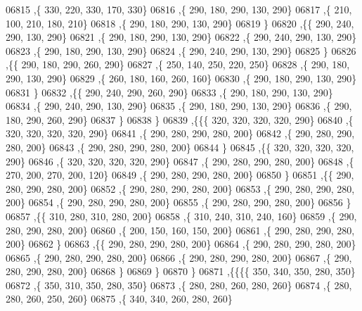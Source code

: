 \begin{DoxyCode}
06815     ,\{   330,   220,   330,   170,   330\}
06816     ,\{   290,   180,   290,   130,   290\}
06817     ,\{   210,   100,   210,   180,   210\}
06818     ,\{   290,   180,   290,   130,   290\}
06819     \}
06820    ,\{\{   290,   240,   290,   130,   290\}
06821     ,\{   290,   180,   290,   130,   290\}
06822     ,\{   290,   240,   290,   130,   290\}
06823     ,\{   290,   180,   290,   130,   290\}
06824     ,\{   290,   240,   290,   130,   290\}
06825     \}
06826    ,\{\{   290,   180,   290,   260,   290\}
06827     ,\{   250,   140,   250,   220,   250\}
06828     ,\{   290,   180,   290,   130,   290\}
06829     ,\{   260,   180,   160,   260,   160\}
06830     ,\{   290,   180,   290,   130,   290\}
06831     \}
06832    ,\{\{   290,   240,   290,   260,   290\}
06833     ,\{   290,   180,   290,   130,   290\}
06834     ,\{   290,   240,   290,   130,   290\}
06835     ,\{   290,   180,   290,   130,   290\}
06836     ,\{   290,   180,   290,   260,   290\}
06837     \}
06838    \}
06839   ,\{\{\{   320,   320,   320,   320,   290\}
06840     ,\{   320,   320,   320,   320,   290\}
06841     ,\{   290,   280,   290,   280,   200\}
06842     ,\{   290,   280,   290,   280,   200\}
06843     ,\{   290,   280,   290,   280,   200\}
06844     \}
06845    ,\{\{   320,   320,   320,   320,   290\}
06846     ,\{   320,   320,   320,   320,   290\}
06847     ,\{   290,   280,   290,   280,   200\}
06848     ,\{   270,   200,   270,   200,   120\}
06849     ,\{   290,   280,   290,   280,   200\}
06850     \}
06851    ,\{\{   290,   280,   290,   280,   200\}
06852     ,\{   290,   280,   290,   280,   200\}
06853     ,\{   290,   280,   290,   280,   200\}
06854     ,\{   290,   280,   290,   280,   200\}
06855     ,\{   290,   280,   290,   280,   200\}
06856     \}
06857    ,\{\{   310,   280,   310,   280,   200\}
06858     ,\{   310,   240,   310,   240,   160\}
06859     ,\{   290,   280,   290,   280,   200\}
06860     ,\{   200,   150,   160,   150,   200\}
06861     ,\{   290,   280,   290,   280,   200\}
06862     \}
06863    ,\{\{   290,   280,   290,   280,   200\}
06864     ,\{   290,   280,   290,   280,   200\}
06865     ,\{   290,   280,   290,   280,   200\}
06866     ,\{   290,   280,   290,   280,   200\}
06867     ,\{   290,   280,   290,   280,   200\}
06868     \}
06869    \}
06870   \}
06871  ,\{\{\{\{   350,   340,   350,   280,   350\}
06872     ,\{   350,   310,   350,   280,   350\}
06873     ,\{   280,   280,   260,   280,   260\}
06874     ,\{   280,   280,   260,   250,   260\}
06875     ,\{   340,   340,   260,   280,   260\}

\end{DoxyCode}
